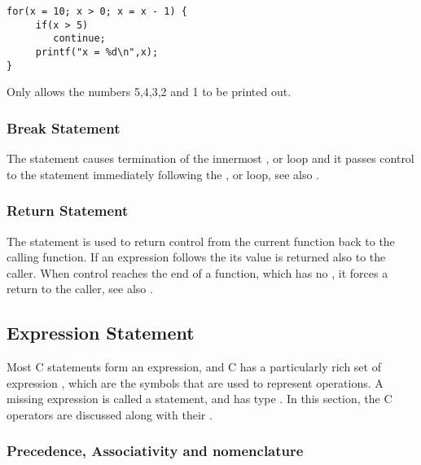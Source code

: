 \begin{production}
\begin{verbatim}
for(x = 10; x > 0; x = x - 1) {
     if(x > 5)  
        continue;
     printf("x = %d\n",x);
}
\end{verbatim}
\end{production}

Only allows the numbers 5,4,3,2 and 1 to be printed out.

\subsubsection{Break Statement}
\label{sec:BreakStatement}

The  statement causes termination of the innermost ,
 or  loop and it passes control to the statement
immediately following the ,
 or  loop, see also .

\subsubsection{Return Statement}
\label{sec:ReturnStatement}

The  statement is used to return control from the current
function back to the calling function. If an expression follows the
 its value is returned also to the caller. When control
reaches the end of a function, which has no , it forces 
a return to the caller, see also .
 

\subsection{Expression Statement}
\label{sec:ExpressionStatement}

Most C statements form an expression, and C has a particularly rich
set of expression , which are the symbols
that are used to represent operations. A missing expression is called
a  statement, and has type . In
this section, the C operators are discussed along with their
.

\subsubsection{Precedence, Associativity and nomenclature}
\label{sec:Precedence}

